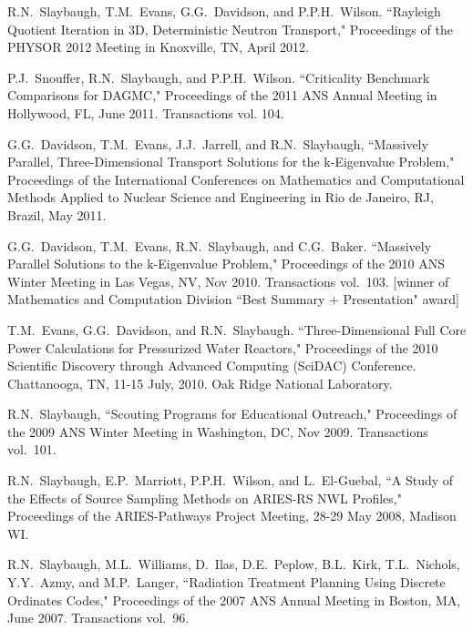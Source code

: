 \begin{bibsection}
\item R.N.\ Slaybaugh, T.M.\ Evans, G.G.\ Davidson, and P.P.H.\ Wilson. ``Rayleigh Quotient Iteration in 3D, Deterministic Neutron Transport," Proceedings of the PHYSOR 2012 Meeting in Knoxville, TN, April 2012.

\item P.J.\ Snouffer, R.N.\ Slaybaugh, and P.P.H.\ Wilson. ``Criticality Benchmark Comparisons for DAGMC," Proceedings of the 2011 ANS Annual Meeting in Hollywood, FL, June 2011. Transactions vol. 104.

\item G.G.\ Davidson, T.M.\ Evans, J.J.\ Jarrell, and R.N.\ Slaybaugh, ``Massively Parallel, Three-Dimensional Transport Solutions for the k-Eigenvalue Problem," Proceedings of the International Conferences on Mathematics and Computational Methods Applied to Nuclear Science and Engineering in Rio de Janeiro, RJ, Brazil, May 2011.

\item G.G.\ Davidson, T.M.\ Evans, R.N.\ Slaybaugh, and C.G.\ Baker.  ``Massively Parallel Solutions to the k-Eigenvalue Problem," Proceedings of the 2010 ANS Winter Meeting in Las Vegas, NV, Nov 2010. Transactions vol.\ 103. [winner of Mathematics and Computation Division ``Best Summary + Presentation" award]

\item T.M.\ Evans, G.G.\ Davidson, and R.N.\ Slaybaugh.  ``Three-Dimensional Full Core Power Calculations for Pressurized Water Reactors," Proceedings of the 2010 Scientific Discovery through Advanced Computing (SciDAC) Conference. Chattanooga, TN, 11-15 July, 2010. Oak Ridge National Laboratory.

\item R.N.\ Slaybaugh, ``Scouting Programs for Educational Outreach," Proceedings of the 2009 ANS Winter Meeting in Washington, DC, Nov 2009. Transactions vol.\ 101.

\item R.N.\ Slaybaugh, E.P.\ Marriott, P.P.H.\ Wilson, and L.\ El-Guebal, ``A Study of the Effects of Source Sampling Methods on ARIES-RS NWL Profiles," Proceedings of the ARIES-Pathways Project Meeting, 28-29 May 2008, Madison WI. 

\item R.N.\ Slaybaugh, M.L.\ Williams, D.\ Ilas, D.E.\ Peplow, B.L.\ Kirk, T.L.\ Nichols, Y.Y.\ Azmy, and M.P.\ Langer, ``Radiation Treatment Planning Using Discrete Ordinates Codes," Proceedings of the 2007 ANS Annual Meeting in Boston, MA, June 2007. Transactions vol.\ 96.


\end{bibsection}
